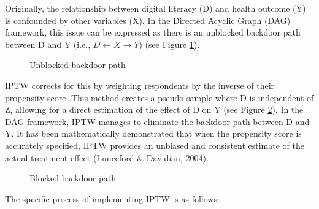 Originally, the relationship between digital literacy (D) and health outcome (Y) is confounded by other variables (X). In the Directed Acyclic Graph (DAG) framework, this issue can be expressed as there is an unblocked backdoor path between D and Y (i.e., $D \leftarrow X \rightarrow Y$) (see Figure \ref{fig:backdoor}). 

\begin{figure}[h!]
    \centering
    \caption{Unblocked backdoor path}
    \label{fig:backdoor}
\end{figure}

IPTW corrects for this by weighting respondents by the inverse of their propensity score. This method creates a pseudo-sample where D is independent of Z, allowing for a direct estimation of the effect of D on Y (see Figure \ref{fig:blocked}). In the DAG framework, IPTW manages to eliminate the backdoor path between D and Y. It has been mathematically demonstrated that when the propensity score is accurately specified, IPTW provides an unbiased and consistent estimate of the actual treatment effect (Lunceford \& Davidian, 2004).

\begin{figure}[h!]
    \centering
    \caption{Blocked backdoor path}
    \label{fig:blocked}
\end{figure}

The specific process of implementing IPTW is as follows:

